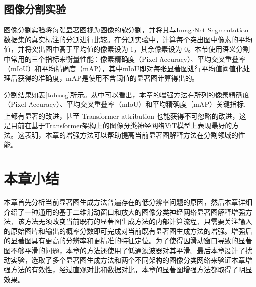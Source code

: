 \subsection{图像分割实验}
图像分割实验将每张显著图视为图像的软分割，并将其与ImageNet-Segmentation数据集的真实标注的分割进行比较。在分割实验中，计算每个突出图中像素的平均值，并将突出图中高于平均值的像素设为 1，其余像素设为 0。本节使用语义分割中常用的三个指标来衡量性能：像素精确度（Pixel Accuracy）、平均交叉重叠率（mIoU）和平均精确度（mAP），其中mIoU即对每张显著图进行平均值阈值化处理后获得的准确度，mAP是使用不含阈值的显著图计算得出的。

分割结果如表\ref{tab:seg}所示。从中可以看出，本章的增强方法在所列的像素精确度（Pixel Accuracy）、平均交叉重叠率（mIoU）和平均精确度（mAP）关键指标,上都有显著的改进，甚至 Transformer attribution\textsuperscript{\cite{chefer2021transformer}} 也能获得不可忽略的改进，这是目前在基于Transformer架构上的图像分类神经网络ViT模型上表现最好的方法。这表明，本章的增强方法可以帮助提高当前显著图解释方法在分割领域的性能。

	
\section{本章小结}
本章首先分析当前显著图生成方法普遍存在的低分辨率问题的原因，然后本章详细介绍了一种通用的基于二维滑动窗口和放大的图像分类神经网络显著图解释增强方法，该方法无须改变当前既有的显著图生成方法的内部计算流程，只需要关注输入的原始图片和输出的概率分数即可完成对当前既有显著图生成方法的增强。增强后的显著图具有更高的分辨率和更精准的特征定位。为了使得因滑动窗口导致的显著图不够平滑的问题，本章的方法还使用了低通滤波器对其平滑。最后本章设计了扰动实验，选取了多个显著图生成方法和两个不同架构的图像分类网络来验证本章增强方法的有效性，经过直观对比和数据对比，本章的显著图增强方法都取得了明显效果。 

